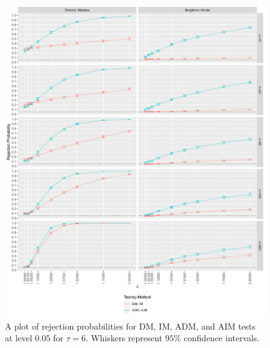 \documentclass[11pt,dvipsnames]{article}
\begin{document}
\begin{appendices}
\begin{figure}[!htbp]
\centering
\includegraphics[width=.9\linewidth]{../../Scripts/Power/Outputs/Power_h=6_Article.pdf}
\caption{A plot of rejection probabilities for DM, IM, ADM, and AIM tests at level $ 0.05 $ for $ \tau=6 $. Whiskers represent $ 95\% $ confidence intervals.
}
\label{fig:Power_6} 
\end{figure}



\end{appendices}
\end{document}
